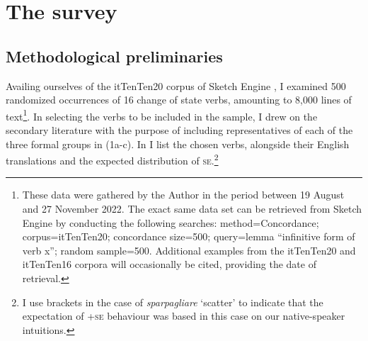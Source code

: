 \documentclass[output=paper,colorlinks,citecolor=brown
]{langscibook}
\begin{document}
\section{The survey}
\label{bentley_section_3}
\subsection{Methodological preliminaries}
\label{bentley_section_3.1}
Availing ourselves of the itTenTen20 corpus of Sketch Engine \citep{jakubicek2013tenten}, I examined 500 randomized occurrences of 16 change of state verbs, amounting to 8,000 lines of text\footnote{These data were gathered by the Author in the period between 19 August and 27 November 2022. The exact same data set can be retrieved from Sketch Engine by conducting the following searches: method=Concordance; corpus=itTenTen20; concordance size=500; query=lemma “infinitive form of verb x”; random sample=500. Additional examples from the itTenTen20 and itTenTen16 corpora \citep{jakubicek2013tenten} will occasionally be cited, providing the date of retrieval.}.  In selecting the verbs to be included in the sample, I drew on the secondary literature \citep{folli2005consuming,cennamo2012aspectual,cennamo2021anticausatives,cennamo2011anticausative,alexiadou2015external,bentley2023internally} with the purpose of including representatives of each of the three formal groups in (1a-c). In  I list the chosen verbs, alongside their English translations and the expected distribution of \textsc{se}.\footnote{I use brackets in the case of \textit{sparpagliare} ‘scatter’ to indicate that the expectation of +\textsc{se} behaviour was based in this case on our native-speaker intuitions.}
\end{document}
